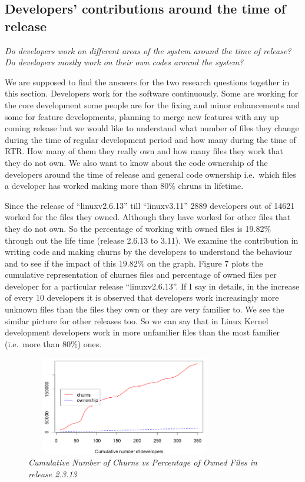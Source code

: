 \documentclass{acm_proc_article-sp}
\begin{document}
\subsection{Developers' contributions around the time of release}
\textit{Do developers work on different areas of the system around the time of release?}\newline
\textit{Do developers mostly work on their own codes around the system?}

We are supposed to find the answers for the two research questions together in this section. Developers work for the software continuously. Some are working for the core development some people are for the fixing and minor enhancements and some for feature developments, planning to merge new features with any up coming release but we would like to understand what number of files they change during the time of regular development period and how many during the time of RTR. How many of them they really own and how many files they work that they do not own. We also want to know about the code ownership of the developers around the time of release and general code ownership i.e.\ which files a developer has worked making more than 80\% chruns in lifetime.

Since the release of ``linuxv2.6.13'' till ``linuxv3.11'' 2889 developers out of 14621 worked for the files they owned. Although they have worked for other files that they do not own. So the percentage of working with owned files is 19.82\% through out the life time (release 2.6.13 to 3.11). We examine the contribution in writing code and making churns by the developers to understand the behaviour and to see if the impact of this 19.82\% on the graph. Figure 7 plots the cumulative representation of churnes files and percentage of owned files per developer for a particular release ``linuxv2.6.13''. If I say in details, in the increase of every 10 developers it is observed that developers work increasingly more unknown files than the files they own or they are very familier to. We see the similar picture for other releases too.
So we can say that in Linux Kernel development developers work in more unfamilier files than the most familier (i.e.\ more than 80\%) ones.
\begin{figure}
\begin{center}
\includegraphics[height=1.7in,width=3.4in]{cumulativeChurnOwnershipPercent.png}
\caption{\small \sl Cumulative Number of Churns vs Percentage of Owned Files in release 2.3.13}
\end{center}
\end{figure}
\end{document}
